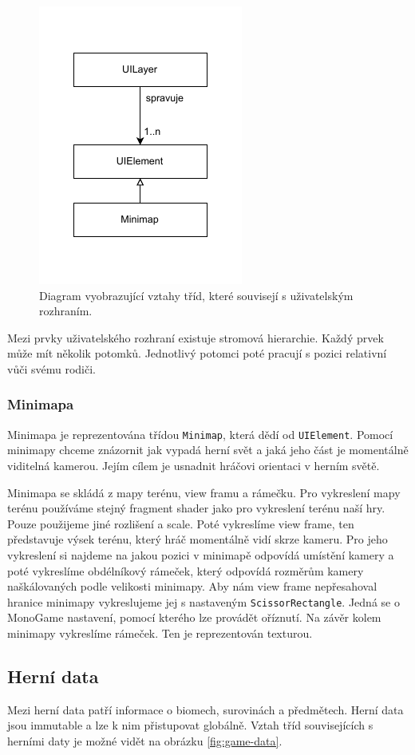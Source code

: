 \begin{figure}[!htb]
  \centering
  \includegraphics[width=0.35\linewidth]{img/ui-layer.pdf}
  \caption{Diagram vyobrazující vztahy tříd, které souvisejí s uživatelským rozhraním.}
  \label{fig:ui-layer}
\end{figure}

Mezi prvky uživatelského rozhraní existuje stromová hierarchie. Každý prvek může mít několik potomků. Jednotlivý potomci poté pracují s pozici relativní vůči svému rodiči.

\subsubsection{Minimapa}
Minimapa je reprezentována třídou \texttt{Minimap}, která dědí od \texttt{UIElement}. Pomocí minimapy chceme znázornit jak vypadá herní svět a jaká jeho část je momentálně viditelná kamerou. Jejím cílem je usnadnit hráčovi orientaci v herním světě.

Minimapa se skládá z mapy terénu, view framu a rámečku. Pro vykreslení mapy terénu používáme stejný fragment shader jako pro vykreslení terénu naší hry. Pouze použijeme jiné rozlišení a scale. Poté vykreslíme view frame, ten představuje výsek terénu, který hráč momentálně vidí skrze kameru. Pro jeho vykreslení si najdeme na jakou pozici v minimapě odpovídá umístění kamery a poté vykreslíme obdélníkový rámeček, který odpovídá rozměrům kamery naškálovaných podle velikosti minimapy. Aby nám view frame nepřesahoval hranice minimapy vykreslujeme jej s nastaveným \texttt{ScissorRectangle}. Jedná se o MonoGame nastavení, pomocí kterého lze provádět oříznutí. Na závěr kolem minimapy vykreslíme rámeček. Ten je reprezentován texturou.

\subsection{Herní data}
Mezi herní data patří informace o biomech, surovinách a předmětech. Herní data jsou immutable a lze k nim přistupovat globálně. Vztah tříd souvisejících s herními daty je možné vidět na obrázku \ref{fig:game-data}.

